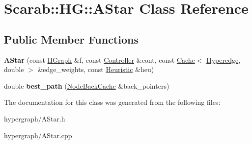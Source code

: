 \hypertarget{class_scarab_1_1_h_g_1_1_a_star}{
\section{Scarab::HG::AStar Class Reference}
\label{class_scarab_1_1_h_g_1_1_a_star}
}
\subsection*{Public Member Functions}
\begin{DoxyCompactItemize}
\item 
\hypertarget{class_scarab_1_1_h_g_1_1_a_star_add1bfbed92beae4cd239af9a150b060b}{
{\bfseries AStar} (const \hyperlink{class_scarab_1_1_h_g_1_1_h_graph}{HGraph} \&f, const \hyperlink{class_scarab_1_1_h_g_1_1_controller}{Controller} \&cont, const \hyperlink{class_cache}{Cache}$<$ \hyperlink{class_scarab_1_1_h_g_1_1_hyperedge}{Hyperedge}, double $>$ \&edge\_\-weights, const \hyperlink{class_scarab_1_1_h_g_1_1_heuristic}{Heuristic} \&heu)}
\label{class_scarab_1_1_h_g_1_1_a_star_add1bfbed92beae4cd239af9a150b060b}

\item 
\hypertarget{class_scarab_1_1_h_g_1_1_a_star_a8079591e07aa9c4a5e4e14a5b1acb18b}{
double {\bfseries best\_\-path} (\hyperlink{class_cache}{NodeBackCache} \&back\_\-pointers)}
\label{class_scarab_1_1_h_g_1_1_a_star_a8079591e07aa9c4a5e4e14a5b1acb18b}

\end{DoxyCompactItemize}


The documentation for this class was generated from the following files:\begin{DoxyCompactItemize}
\item 
hypergraph/AStar.h\item 
hypergraph/AStar.cpp\end{DoxyCompactItemize}
